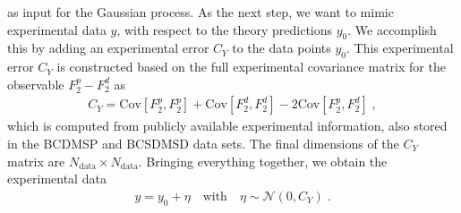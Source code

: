 \documentclass[11pt,a4paper]{article}
\begin{document}
%
as input for the Gaussian process. 
As the next step, we want to mimic experimental data $y$, with respect to the theory predictions $y_0$. We accomplish this by adding an experimental error $C_Y$ to the data points $y_0$. This experimental error $C_Y$ is constructed based on the full experimental covariance matrix for the observable $F_2^p - F_2^d$ as
%
\begin{align}
    C_Y = \mathrm{Cov}[F_2^p, F_2^p] + \mathrm{Cov}[F_2^d, F_2^d] -2 \mathrm{Cov}[F_2^p, F_2^d] \; ,
\end{align}
%
which is computed from publicly available experimental information, also stored in the BCDMSP and BCSDMSD data sets.
The final dimensions of the $C_Y$ matrix are $N_\mathrm{data} \times N_\mathrm{data}$.
Bringing everything together, we obtain the experimental data
%
\begin{align}
    y = y_0 + \eta \quad \text{with} \quad \eta \sim \mathcal{N}(0, C_Y) \; .
\end{align}
%
\end{document}
